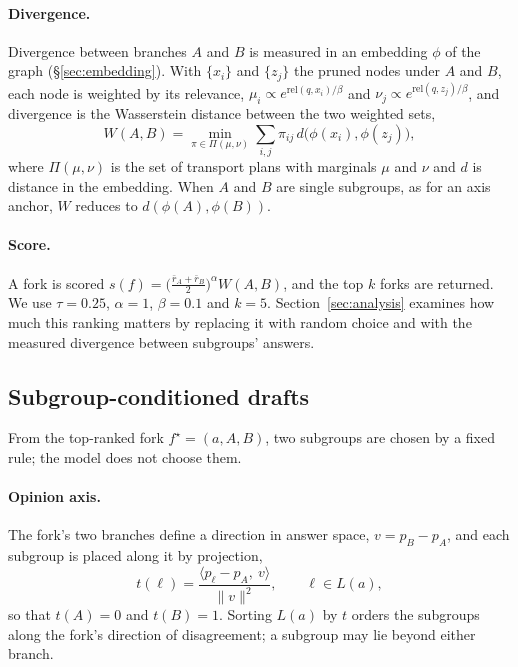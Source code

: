 \documentclass[11pt]{article}
\begin{document}
\paragraph{Divergence.}
Divergence between branches $A$ and $B$ is measured in an embedding $\phi$ of
the graph (\S\ref{sec:embedding}). With $\{x_i\}$ and $\{z_j\}$ the pruned
nodes under $A$ and $B$, each node is weighted by its relevance,
$\mu_i \propto e^{\mathrm{rel}(q, x_i)/\beta}$ and
$\nu_j \propto e^{\mathrm{rel}(q, z_j)/\beta}$, and divergence is the
Wasserstein distance between the two weighted sets,
\begin{equation}
  W(A, B) = \min_{\pi \in \Pi(\mu, \nu)} \sum_{i, j} \pi_{ij}\, d\bigl(\phi(x_i), \phi(z_j)\bigr),
\end{equation}
where $\Pi(\mu, \nu)$ is the set of transport plans with marginals $\mu$ and
$\nu$ and $d$ is distance in the embedding. When $A$ and $B$ are single
subgroups, as for an axis anchor, $W$ reduces to $d(\phi(A), \phi(B))$.

\paragraph{Score.}
A fork is scored
$s(f) = \bigl(\tfrac{\bar r_A + \bar r_B}{2}\bigr)^{\alpha} W(A, B)$, and the
top $k$ forks are returned. We use $\tau = 0.25$, $\alpha = 1$, $\beta = 0.1$
and $k = 5$. Section~\ref{sec:analysis} examines how much this ranking matters
by replacing it with random choice and with the measured divergence between
subgroups' answers.

\subsection{Subgroup-conditioned drafts}
\label{sec:personas}

From the top-ranked fork $f^\star = (a, A, B)$, two subgroups are chosen by a
fixed rule; the model does not choose them.

\paragraph{Opinion axis.}
The fork's two branches define a direction in answer space, $v = p_B - p_A$,
and each subgroup is placed along it by projection,
\begin{equation}
  t(\ell) = \frac{\langle p_\ell - p_A,\ v \rangle}{\lVert v \rVert^{2}},
  \qquad \ell \in L(a),
\end{equation}
so that $t(A) = 0$ and $t(B) = 1$. Sorting $L(a)$ by $t$ orders the subgroups
along the fork's direction of disagreement; a subgroup may lie beyond either
branch.
\end{document}
